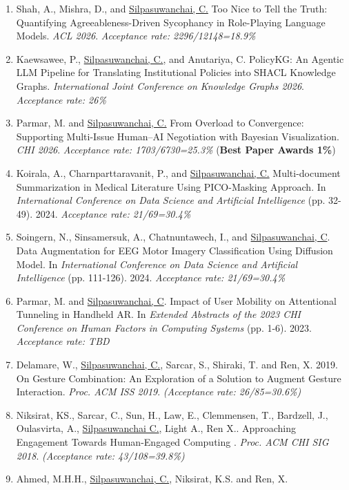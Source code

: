 \documentclass[letterpaper,11pt]{article}
\makeatletter
\newlength{\bibhang}
\newlength{\bibsep}
{\@listi \global\bibsep\itemsep \global\advance\bibsep by\parsep}
\newenvironment{bibsection}%
{\begin{enumerate}{}{%
			
			\setlength{\leftmargin}{\bibhang}%
			\setlength{\itemindent}{-\leftmargin}%
			\setlength{\itemsep}{\bibsep}%
			\setlength{\parsep}{\z@}%
			\setlength{\partopsep}{0pt}%
			\setlength{\topsep}{0pt}}}
	{\end{enumerate}}
\makeatother
\begin{document}
 \begin{bibsection}
    \footnotesize
    \item Shah, A., Mishra, D., and \underline{Silpasuwanchai, C.} Too Nice to Tell the Truth: Quantifying Agreeableness-Driven Sycophancy in Role-Playing Language Models. \textit{ACL 2026}. \textit{Acceptance rate: 2296/12148=18.9\% }
    \item Kaewsawee, P., \underline{Silpasuwanchai, C.}, and Anutariya, C. PolicyKG: An Agentic LLM Pipeline for Translating Institutional Policies into SHACL Knowledge Graphs. \textit{International Joint Conference on Knowledge Graphs 2026}. \textit{Acceptance rate:  26\%}
    \item Parmar, M. and \underline{Silpasuwanchai, C.}  From Overload to Convergence: Supporting Multi-Issue Human–AI Negotiation with Bayesian Visualization. \textit{CHI 2026}. \textit{Acceptance rate: 1703/6730=25.3\% }(\textbf{Best Paper Awards 1\%})
    \item Koirala, A., Charnparttaravanit, P., and \underline{Silpasuwanchai, C.} Multi-document Summarization in Medical Literature Using PICO-Masking Approach. In \textit{International Conference on Data Science and Artificial Intelligence} (pp. 32-49). 2024. \textit{Acceptance rate: 21/69=30.4\% }
    \item Soingern, N., Sinsamersuk, A., Chatnuntawech, I., and \underline{Silpasuwanchai, C}. Data Augmentation for EEG Motor Imagery Classification Using Diffusion Model. In \textit{International Conference on Data Science and Artificial Intelligence} (pp. 111-126). 2024. \textit{Acceptance rate: 21/69=30.4\% }
     \item Parmar, M. and \underline{Silpasuwanchai, C}. Impact of User Mobility on Attentional Tunneling in Handheld AR. In \textit{Extended Abstracts of the 2023 CHI Conference on Human Factors in Computing Systems} (pp. 1-6). 2023. \textit{Acceptance rate: TBD }
    \item Delamare, W., \underline{Silpasuwanchai, C.}, Sarcar, S., Shiraki, T. and Ren, X. 2019. On Gesture Combination: An Exploration of a Solution to Augment Gesture Interaction. \textit{Proc. ACM ISS 2019}.  \textit{(Acceptance rate: 26/85=30.6\%)}
	\item Niksirat, KS., Sarcar, C., Sun, H., Law, E., Clemmensen, T., Bardzell, J., Oulasvirta, A., \underline{Silpasuwanchai C.}, Light A., Ren X.. Approaching Engagement Towards Human-Engaged Computing . \textit{Proc. ACM CHI SIG 2018}.   \textit{(Acceptance rate: 43/108=39.8\%)}
	\item Ahmed, M.H.H., \underline{Silpasuwanchai, C.}, Niksirat, K.S. and Ren, X.

\end{bibsection}
\end{document}
